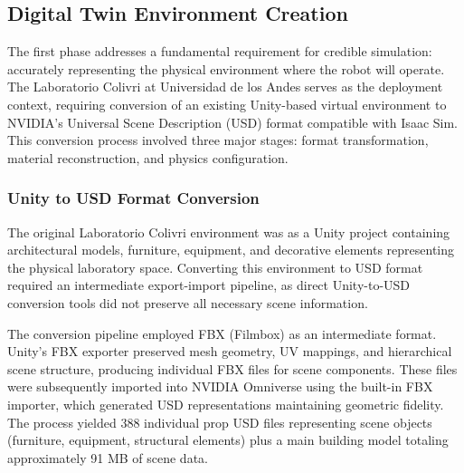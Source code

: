 \documentclass[12pt,a4paper]{article}
\begin{document}
\subsection{Digital Twin Environment Creation}

The first phase addresses a fundamental requirement for credible simulation: accurately representing the physical environment where the robot will operate. The Laboratorio Colivri at Universidad de los Andes serves as the deployment context, requiring conversion of an existing Unity-based virtual environment to NVIDIA's Universal Scene Description (USD) format compatible with Isaac Sim. This conversion process involved three major stages: format transformation, material reconstruction, and physics configuration.

\subsubsection{Unity to USD Format Conversion}

The original Laboratorio Colivri environment was as a Unity project containing architectural models, furniture, equipment, and decorative elements representing the physical laboratory space. Converting this environment to USD format required an intermediate export-import pipeline, as direct Unity-to-USD conversion tools did not preserve all necessary scene information.

The conversion pipeline employed FBX (Filmbox) as an intermediate format. Unity's FBX exporter preserved mesh geometry, UV mappings, and hierarchical scene structure, producing individual FBX files for scene components. These files were subsequently imported into NVIDIA Omniverse using the built-in FBX importer, which generated USD representations maintaining geometric fidelity. The process yielded 388 individual prop USD files representing scene objects (furniture, equipment, structural elements) plus a main building model totaling approximately 91 MB of scene data.
\end{document}
